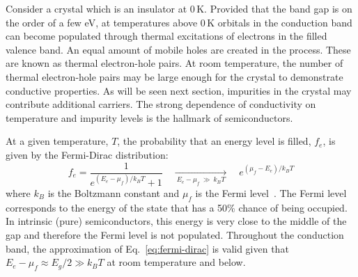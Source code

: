 Consider a crystal which is an insulator at 0\,K. Provided that the band gap is on the order of a few eV, at temperatures above 0\,K orbitals in the conduction band can become populated through thermal excitations of electrons in the filled valence band. An equal amount of mobile holes are created in the process. These are known as thermal electron-hole pairs. At room temperature, the number of thermal electron-hole pairs may be large enough for the crystal to demonstrate conductive properties. As will be seen next section, impurities in the crystal may contribute additional carriers. The strong dependence of conductivity on temperature and impurity levels is the hallmark of semiconductors.

At a given temperature, $T$, the probability that an energy level is filled, $f_e$, is given by the Fermi-Dirac distribution:
\begin{equation}
	f_e = \frac{1}{e^{(E_e - \mu_f)/k_BT}+1} \quad \xrightarrow[~E_e-\mu_f~\gg~k_BT~]{}\quad e^{(\mu_f - E_e)/k_BT}
	\label{eq:fermi-dirac}
\end{equation}
where $k_B$ is the Boltzmann constant and $\mu_f$ is the Fermi level~\cite{fermi-dirac}. The Fermi level corresponds to the energy of the state that has a 50\% chance of being occupied. In intrinsic (pure) semiconductors, this energy is very close to the middle of the gap and therefore the Fermi level is not populated. Throughout the conduction band, the approximation of Eq.~\ref{eq:fermi-dirac} is valid given that $E_e-\mu_f \approx E_g/2 \gg k_BT$ at room temperature and below. 

